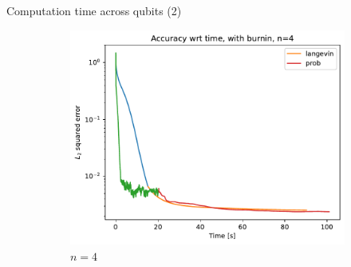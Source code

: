 \documentclass{beamer}
\begin{document}
\begin{frame}{Computation time across qubits (2)}
\begin{figure}[H]
\begin{subfigure}[b]{0.4\textwidth}
            \includegraphics[width=\textwidth]{figures/experiments/baseline/diff_n_qubits/iters_acc_comp_time_no_avg_n4-1.png}
    
            \caption{$n=4$}
    
            \label{fig:conv-plot-diff-n-4-sub}
    
        \end{subfigure}
        \begin{subfigure}[b]{0.4\textwidth}
    
    

\end{subfigure}
\end{figure}
\end{frame}
\end{document}
